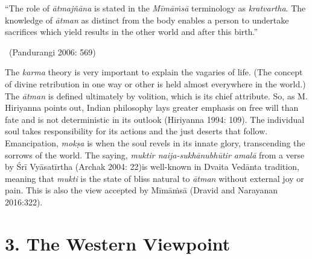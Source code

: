 \begin{myquote}
“The role of \textit{ātmajñāna} is stated in the \textit{Mīmāṁsā} terminology as \textit{kratvartha}. The knowledge of \textit{ātman} as distinct from the body enables a person to undertake sacrifices which yield results in the other world and after this birth.” 

~\hfill (Pandurangi 2006: 569)
\end{myquote}

The \textit{karma} theory is very important to explain the vagaries of life. (The concept of divine retribution in one way or other is held almost everywhere in the world.) The \textit{ātman} is defined ultimately by volition, which is its chief attribute. So, as M. Hiriyanna points out, Indian philosophy lays greater emphasis on free will than fate and is not deterministic in its outlook (Hiriyanna 1994: 109). The individual soul takes responsibility for its actions and the just deserts that follow. Emancipation, \textit{mokṣa} is when the soul revels in its innate glory, transcending the sorrows of the world. The saying, \textit{muktir naija-sukhānubhūtir amalā} from a verse by Śrī Vyāsatīrtha (Archak 2004: 22)is well-known in {Dvaita Vedānta} tradition, meaning that \textit{mukti} is the state of bliss natural to \textit{ātman} without external joy or pain. This is also the view accepted by Mīmāṁsā (Dravid and Narayanan 2016:322).

\vspace{-.3cm}

\section*{3. The Western Viewpoint}

